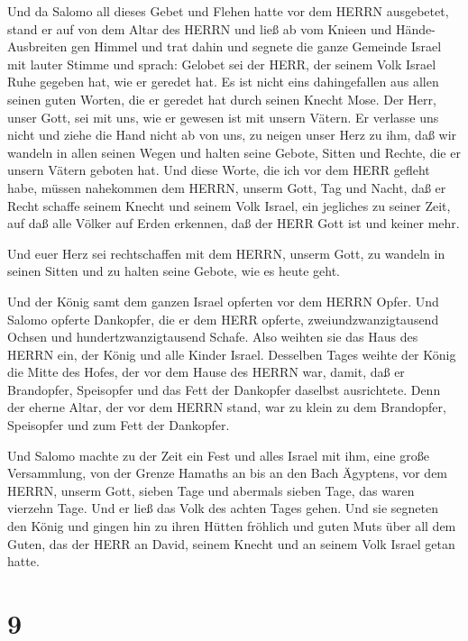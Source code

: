  Und da Salomo all dieses Gebet und Flehen hatte vor dem
HERRN ausgebetet, stand er auf von dem Altar des HERRN und ließ ab vom
Knieen und Hände-Ausbreiten gen Himmel  und trat dahin und
segnete die ganze Gemeinde Israel mit lauter Stimme und sprach:
 Gelobet sei der HERR, der seinem Volk Israel Ruhe gegeben
hat, wie er geredet hat. Es ist nicht eins dahingefallen aus allen
seinen guten Worten, die er geredet hat durch seinen Knecht Mose.
 Der Herr, unser Gott, sei mit uns, wie er gewesen ist mit
unsern Vätern. Er verlasse uns nicht und ziehe die Hand nicht ab von
uns,  zu neigen unser Herz zu ihm, daß wir wandeln in allen
seinen Wegen und halten seine Gebote, Sitten und Rechte, die er unsern
Vätern geboten hat.  Und diese Worte, die ich vor dem HERR
gefleht habe, müssen nahekommen dem HERRN, unserm Gott, Tag und Nacht,
daß er Recht schaffe seinem Knecht und seinem Volk Israel, ein jegliches
zu seiner Zeit,  auf daß alle Völker auf Erden erkennen,
daß der HERR Gott ist und keiner mehr.

 Und euer Herz sei rechtschaffen mit dem HERRN, unserm
Gott, zu wandeln in seinen Sitten und zu halten seine Gebote, wie es
heute geht.

 Und der König samt dem ganzen Israel opferten vor dem
HERRN Opfer.  Und Salomo opferte Dankopfer, die er dem HERR
opferte, zweiundzwanzigtausend Ochsen und hundertzwanzigtausend Schafe.
Also weihten sie das Haus des HERRN ein, der König und alle Kinder
Israel.  Desselben Tages weihte der König die Mitte des
Hofes, der vor dem Hause des HERRN war, damit, daß er Brandopfer,
Speisopfer und das Fett der Dankopfer daselbst ausrichtete. Denn der
eherne Altar, der vor dem HERRN stand, war zu klein zu dem Brandopfer,
Speisopfer und zum Fett der Dankopfer.

 Und Salomo machte zu der Zeit ein Fest und alles Israel
mit ihm, eine große Versammlung, von der Grenze Hamaths an bis an den
Bach Ägyptens, vor dem HERRN, unserm Gott, sieben Tage und abermals
sieben Tage, das waren vierzehn Tage.  Und er ließ das Volk
des achten Tages gehen. Und sie segneten den König und gingen hin zu
ihren Hütten fröhlich und guten Muts über all dem Guten, das der HERR an
David, seinem Knecht und an seinem Volk Israel getan hatte.

\hypertarget{section-8}{%
\section{9}\label{section-8}}

